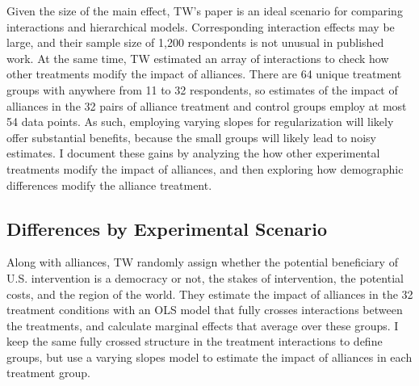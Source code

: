 \documentclass[12pt]{article}
\begin{document}
Given the size of the main effect, TW's paper is an ideal scenario for comparing interactions and hierarchical models. 
Corresponding interaction effects may be large, and their sample size of 1,200 respondents is not unusual in published work. 
At the same time, TW estimated an array of interactions to check how other treatments modify the impact of alliances.
There are 64 unique treatment groups with anywhere from 11 to 32 respondents, so estimates of the impact of alliances in the 32 pairs of alliance treatment and control groups employ at most 54 data points. 
As such, employing varying slopes for regularization will likely offer substantial benefits, because the small groups will likely lead to noisy estimates.
I document these gains by analyzing the how other experimental treatments modify the impact of alliances, and then exploring how demographic differences modify the alliance treatment. 



\subsection{Differences by Experimental Scenario}


Along with alliances, TW randomly assign whether the potential beneficiary of U.S. intervention is a democracy or not, the stakes of intervention, the potential costs, and the region of the world. 
They estimate the impact of alliances in the 32 treatment conditions with an OLS model that fully crosses interactions between the treatments, and calculate marginal effects that average over these groups. 
I keep the same fully crossed structure in the treatment interactions to define groups, but use a varying slopes model to estimate the impact of alliances in each treatment group.
\end{document}
